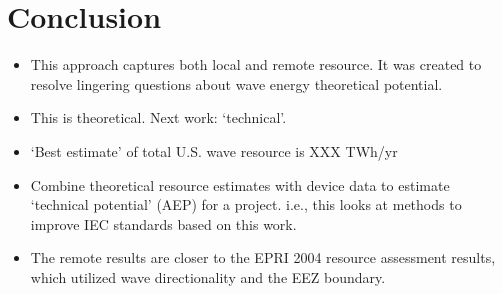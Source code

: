 \section{Conclusion} \label{sec:conclusion}

\begin{itemize}
\item This approach captures both local and remote resource. It was created to resolve lingering questions about wave energy theoretical potential.
\item This is theoretical. Next work: ‘technical’.
\item ‘Best estimate’ of total U.S. wave resource is XXX TWh/yr
\item Combine theoretical resource estimates with device data to estimate ‘technical potential’ (AEP) for a project. i.e., this looks at methods to improve IEC standards based on this work.
\item The remote results are closer to the EPRI 2004 resource assessment results, which utilized wave directionality and the EEZ boundary.
\end{itemize}


